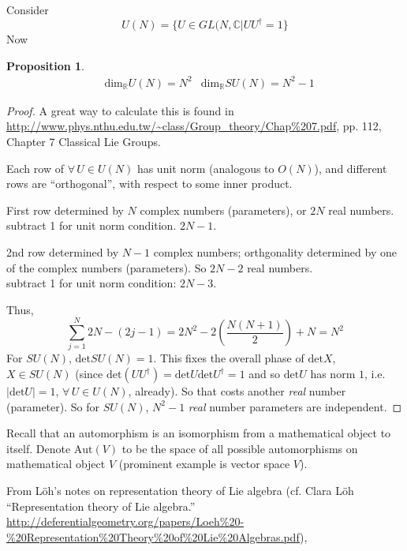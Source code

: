 \documentclass[10pt]{amsart}
\newtheorem{proposition}{Proposition}
\begin{document}
\begin{multicols}{2}
Consider 
\[
U(N) = \lbrace U \in GL(N,\mathbb{C} | UU^{\dag} = 1\rbrace
\]
Now
\begin{proposition}
  \[
\begin{aligned}
& \text{dim}_{\mathbb{R}}U(N) = N^2
& \text{dim}_{\mathbb{R}}SU(N) = N^2 -1
\end{aligned}
\]
\end{proposition}
\begin{proof}
A great way to calculate this is found in \url{http://www.phys.nthu.edu.tw/~class/Group_theory/Chap%207.pdf}, pp. 112, Chapter 7 Classical Lie Groups.  

Each row of $\forall \, U \in U(N)$ has unit norm (analogous to $O(N)$), and different rows are ``orthogonal'', with respect to some inner product.  

First row determined by $N$ complex numbers (parameters), or $2N$ real numbers.  \\
\phantom{First} subtract 1 for unit norm condition.  $2N-1$.  

2nd row determined by $N-1$ complex numbers; orthgonality determined by one of the complex numbers (parameters).  So $2N-2$ real numbers. \\
\phantom{First} subtract 1 for unit norm condition: $2N-3$.  

Thus,
\[
\sum_{j=1}^N 2N - (2j - 1) = 2N^2 - 2\left( \frac{N(N+1)}{2} \right)  + N = N^2
\]
For $SU(N)$, $\text{det}SU(N) =1$.  This fixes the overall phase of $\text{det}X$, $X\in SU(N)$ (since $\text{det}(UU^{\dag}) = \text{det}U \text{det}U^{\dag} = 1$ and so $\text{det}U$ has norm $1$, i.e. $|\text{det}U|=1$, $\forall \, U \in U(N)$, already).  So that costs another \emph{real} number (parameter).  So for $SU(N)$, $N^2-1$ \emph{real} number parameters are independent.  

\end{proof}

Recall that an automorphism is an isomorphism from a mathematical object to itself.  Denote $\text{Aut}(V)$ to be the space of all possible automorphisms on mathematical object $V$ (prominent example is vector space $V$).  


From L\"{o}h's notes on representation theory of Lie algebra (cf. Clara L\"{o}h ``Representation theory of Lie algebra.''  \url{http://deferentialgeometry.org/papers/Loeh%20-%20Representation%20Theory%20of%20Lie%20Algebras.pdf}), 


\end{multicols}
\end{document}
